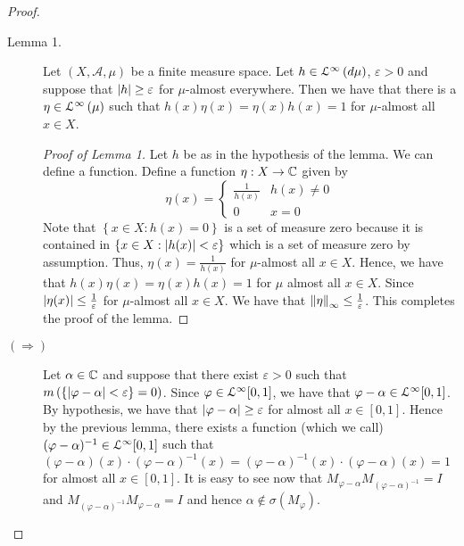\begin{proof}
    \begin{description}
	\item[Lemma 1.] Let $\left( X, \mathscr A, \mu \right)$ be a finite measure space. Let $h \in {\cal L} ^{\infty} \left( d\mu \right)$, $\varepsilon >0$ and suppose that $\left\lvert h \right\rvert \ge \varepsilon$ for $\mu$-almost everywhere. Then we have that there is a $\eta \in {\cal L}^{\infty} \left( \mu \right)$ such that $h(x)\eta(x) = \eta (x) h(x) = 1$ for $\mu$-almost all $x\in X$.
	    \begin{proof}[Proof of Lemma 1]
		Let $h$ be as in the hypothesis of the lemma. We can define a function. Define a function $\eta : X \to \mathbb C$ given by
		\begin{equation*}
		    \eta (x) = 
		    \begin{cases}
			\frac{1}{h(x)} & h(x)\ne 0 \\
			0 & x = 0
		    \end{cases}
		\end{equation*}
		Note that $\left\{ x \in X : h\left( x \right) = 0 \right\}$ is a set of measure zero because it is contained in $\left\{ x \in X : \left\lvert h(x) \right\rvert < \varepsilon \right\}$ which is a set of measure zero by assumption. Thus, $\eta \left( x \right) = \frac{1}{h(x)}$ for $\mu$-almost all $x \in X$. Hence, we have that $h(x)\eta(x) = \eta(x) h(x) = 1$ for $\mu$ almost all $x\in X$. Since $\left\lvert \eta (x) \right\rvert \le \frac{1}{\varepsilon}$ for $\mu$-almost all $x\in X$. We have that $\left\lVert \eta \right\rVert_{\infty} \le \frac{1}{\varepsilon}$. This completes the proof of the lemma.
	    \end{proof}
	\item[$\left( \Longrightarrow \right)$] Let $\alpha \in \mathbb C$ and suppose that there exist $\varepsilon>0$ such that $m\left( \left\{ \left\lvert \varphi -\alpha \right\rvert < \varepsilon \right\} =0 \right)$. Since $\varphi \in {\cal L} ^{\infty} [0,1]$, we have that $\varphi - \alpha \in {\cal L} ^{\infty} [0,1]$. By hypothesis, we have that $\left\lvert \varphi - \alpha \right\rvert \ge \varepsilon$ for almost all $x \in [0,1]$. Hence by the previous lemma, there exists a function (which we call) $(\varphi - \alpha ) ^{-1} \in {\cal L} ^{\infty} [0,1]$ such that $\left( \varphi -\alpha \right) (x) \cdot \left( \varphi - \alpha \right)^{-1} (x) = \left( \varphi -\alpha \right)^{-1} (x) \cdot \left( \varphi - \alpha \right) (x)  = 1$ for almost all $x\in [0,1]$. It is easy to see now that $M_{\varphi - \alpha} M_{\left( \varphi - \alpha \right)^{-1}} = I$ and $M_{\left( \varphi - \alpha \right)^{-1}} M_{\varphi - \alpha} = I$ and hence $\alpha \not\in \sigma \left( M_{\varphi} \right)$.

\end{description}
\end{proof}
